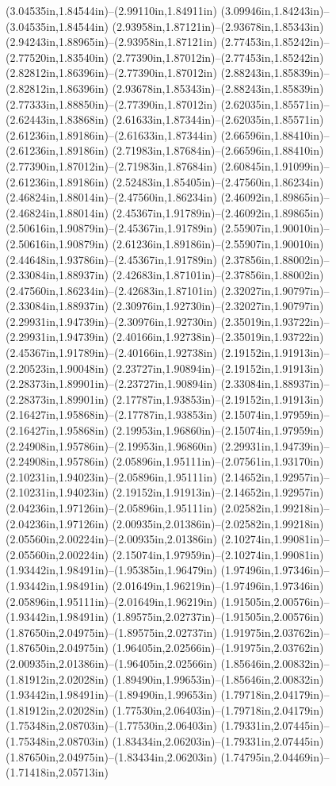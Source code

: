 (3.04535in,1.84544in)--(2.99110in,1.84911in) (3.09946in,1.84243in)--(3.04535in,1.84544in) (2.93958in,1.87121in)--(2.93678in,1.85343in) (2.94243in,1.88965in)--(2.93958in,1.87121in) (2.77453in,1.85242in)--(2.77520in,1.83540in) (2.77390in,1.87012in)--(2.77453in,1.85242in) (2.82812in,1.86396in)--(2.77390in,1.87012in) (2.88243in,1.85839in)--(2.82812in,1.86396in) (2.93678in,1.85343in)--(2.88243in,1.85839in) (2.77333in,1.88850in)--(2.77390in,1.87012in) (2.62035in,1.85571in)--(2.62443in,1.83868in) (2.61633in,1.87344in)--(2.62035in,1.85571in) (2.61236in,1.89186in)--(2.61633in,1.87344in) (2.66596in,1.88410in)--(2.61236in,1.89186in) (2.71983in,1.87684in)--(2.66596in,1.88410in) (2.77390in,1.87012in)--(2.71983in,1.87684in) (2.60845in,1.91099in)--(2.61236in,1.89186in) (2.52483in,1.85405in)--(2.47560in,1.86234in) (2.46824in,1.88014in)--(2.47560in,1.86234in) (2.46092in,1.89865in)--(2.46824in,1.88014in) (2.45367in,1.91789in)--(2.46092in,1.89865in) (2.50616in,1.90879in)--(2.45367in,1.91789in) (2.55907in,1.90010in)--(2.50616in,1.90879in) (2.61236in,1.89186in)--(2.55907in,1.90010in) (2.44648in,1.93786in)--(2.45367in,1.91789in) (2.37856in,1.88002in)--(2.33084in,1.88937in) (2.42683in,1.87101in)--(2.37856in,1.88002in) (2.47560in,1.86234in)--(2.42683in,1.87101in) (2.32027in,1.90797in)--(2.33084in,1.88937in) (2.30976in,1.92730in)--(2.32027in,1.90797in) (2.29931in,1.94739in)--(2.30976in,1.92730in) (2.35019in,1.93722in)--(2.29931in,1.94739in) (2.40166in,1.92738in)--(2.35019in,1.93722in) (2.45367in,1.91789in)--(2.40166in,1.92738in) (2.19152in,1.91913in)--(2.20523in,1.90048in) (2.23727in,1.90894in)--(2.19152in,1.91913in) (2.28373in,1.89901in)--(2.23727in,1.90894in) (2.33084in,1.88937in)--(2.28373in,1.89901in) (2.17787in,1.93853in)--(2.19152in,1.91913in) (2.16427in,1.95868in)--(2.17787in,1.93853in) (2.15074in,1.97959in)--(2.16427in,1.95868in) (2.19953in,1.96860in)--(2.15074in,1.97959in) (2.24908in,1.95786in)--(2.19953in,1.96860in) (2.29931in,1.94739in)--(2.24908in,1.95786in) (2.05896in,1.95111in)--(2.07561in,1.93170in) (2.10231in,1.94023in)--(2.05896in,1.95111in) (2.14652in,1.92957in)--(2.10231in,1.94023in) (2.19152in,1.91913in)--(2.14652in,1.92957in) (2.04236in,1.97126in)--(2.05896in,1.95111in) (2.02582in,1.99218in)--(2.04236in,1.97126in) (2.00935in,2.01386in)--(2.02582in,1.99218in) (2.05560in,2.00224in)--(2.00935in,2.01386in) (2.10274in,1.99081in)--(2.05560in,2.00224in) (2.15074in,1.97959in)--(2.10274in,1.99081in) (1.93442in,1.98491in)--(1.95385in,1.96479in) (1.97496in,1.97346in)--(1.93442in,1.98491in) (2.01649in,1.96219in)--(1.97496in,1.97346in) (2.05896in,1.95111in)--(2.01649in,1.96219in) (1.91505in,2.00576in)--(1.93442in,1.98491in) (1.89575in,2.02737in)--(1.91505in,2.00576in) (1.87650in,2.04975in)--(1.89575in,2.02737in) (1.91975in,2.03762in)--(1.87650in,2.04975in) (1.96405in,2.02566in)--(1.91975in,2.03762in) (2.00935in,2.01386in)--(1.96405in,2.02566in) (1.85646in,2.00832in)--(1.81912in,2.02028in) (1.89490in,1.99653in)--(1.85646in,2.00832in) (1.93442in,1.98491in)--(1.89490in,1.99653in) (1.79718in,2.04179in)--(1.81912in,2.02028in) (1.77530in,2.06403in)--(1.79718in,2.04179in) (1.75348in,2.08703in)--(1.77530in,2.06403in) (1.79331in,2.07445in)--(1.75348in,2.08703in) (1.83434in,2.06203in)--(1.79331in,2.07445in) (1.87650in,2.04975in)--(1.83434in,2.06203in) (1.74795in,2.04469in)--(1.71418in,2.05713in) 